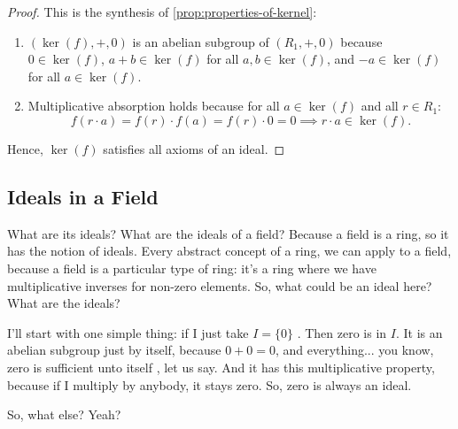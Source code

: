 \begin{content}

\begin{proof}
This is the synthesis of \cref{prop:properties-of-kernel}:
\begin{enumerate}[label=\textbf{(\arabic*)}]
    \item $(\ker(f), +, 0)$ is an abelian subgroup of $(R_1, +, 0)$ because $0 \in \ker(f)$, $a + b \in \ker(f)$ for all $a, b \in \ker(f)$, and $-a \in \ker(f)$ for all $a \in \ker(f)$.
    \item Multiplicative absorption holds because for all $a \in \ker(f)$ and all $r \in R_1$:
    \[
    f(r \cdot a) = f(r) \cdot f(a) = f(r) \cdot 0 = 0 \implies r \cdot a \in \ker(f).
    \]
\end{enumerate}
Hence, $\ker(f)$ satisfies all axioms of an ideal.
\end{proof}
\end{content}

\subsection{Ideals in a Field}

\begin{speech}[00:39:13 - 00:40:05]
What are its ideals? What are the ideals of a field? Because a field is a ring, so it has the notion of ideals. Every abstract concept of a ring, we can apply to a field, because a field is a particular type of ring: it's a ring where we have multiplicative inverses for non-zero elements. So, what could be an ideal here? What are the ideals?

I'll start with one simple thing: if I just take $I = \{0\}$ . Then zero is in $I$. It is an abelian subgroup just by itself, because $0 + 0 = 0$, and everything... you know, zero is sufficient unto itself , let us say. And it has this multiplicative property, because if I multiply by anybody, it stays zero. So, zero is always an ideal.

So, what else? Yeah? 
\end{speech}

